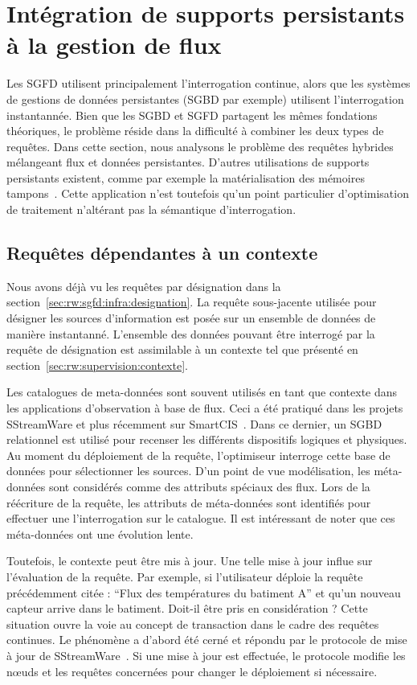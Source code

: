 \section{Intégration de supports persistants à la gestion de flux}\label{sec:rw:sgfd:persistance}
Les SGFD utilisent principalement l'interrogation continue, alors que les systèmes de gestions de données persistantes (SGBD par exemple) utilisent l'interrogation instantannée. Bien que les SGBD et SGFD partagent les mêmes fondations théoriques, le problème réside dans la difficulté à combiner les deux types de requêtes. Dans cette section, nous analysons le problème des requêtes hybrides mélangeant flux et données persistantes. D'autres utilisations de supports persistants existent, comme par exemple la matérialisation des mémoires tampons~\cite{Abadi:aurora}. Cette application n'est toutefois qu'un point particulier d'optimisation de traitement n'altérant pas la sémantique d'interrogation.

\subsection{Requêtes dépendantes à un contexte}
Nous avons déjà vu les requêtes par désignation dans la section~\ref{sec:rw:sgfd:infra:designation}. La requête sous-jacente utilisée pour désigner les sources d'information est posée sur un ensemble de données de manière instantanné. L'ensemble des données pouvant être interrogé par la requête de désignation est assimilable à un contexte tel que présenté en section~\ref{sec:rw:supervision:contexte}.

Les catalogues de meta-données sont souvent utilisés en tant que contexte dans les applications d'observation à base de flux. Ceci a été pratiqué dans les projets SStreamWare et plus récemment sur SmartCIS~\cite{Liu:smartcis}. Dans ce dernier, un SGBD relationnel est utilisé pour recenser les différents dispositifs logiques et physiques. Au moment du déploiement de la requête, l'optimiseur interroge cette base de données pour sélectionner les sources. D'un point de vue modélisation, les méta-données sont considérés comme des attributs spéciaux des flux. Lors de la réécriture de la requête, les attributs de méta-données sont identifiés pour effectuer une l'interrogation sur le catalogue. Il est intéressant de noter que ces méta-données ont une évolution lente.

Toutefois, le contexte peut être mis à jour. Une telle mise à jour influe sur l'évaluation de la requête. Par exemple, si l'utilisateur déploie la requête précédemment citée : \enquote{Flux des températures du batiment A} et qu'un nouveau capteur arrive dans le batiment. Doit-il être pris en considération ? Cette situation ouvre la voie au concept de transaction dans le cadre des requêtes continues. Le phénomène a d'abord été cerné et répondu par le protocole de mise à jour de SStreamWare~\cite{Gurgen:transaction}. Si une mise à jour est effectuée, le protocole modifie les nœuds et les requêtes concernées pour changer le déploiement si nécessaire.

